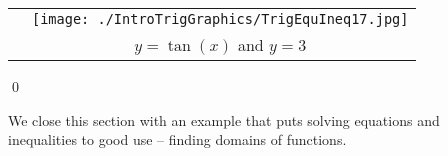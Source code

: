 \begin{ex}
\begin{enumerate}
\begin{center}
\begin{tabular}{m{2in}c}
& 

\hspace{1.25in} \texttt{[image: ./IntroTrigGraphics/TrigEquIneq17.jpg]} \\

& \hspace{1.25in} $y = \tan(x)$ and \boldmath $y =3$ \\

\end{tabular}

\end{center}


\vspace{-.25in} \qed


\end{enumerate}



\end{ex}


We close this section with an example that puts solving equations and inequalities to good use -- finding domains of functions.


